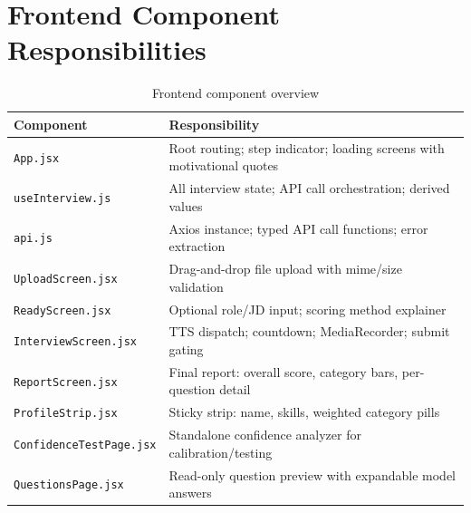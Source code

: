 \documentclass[12pt,a4paper]{article}
\begin{document}
\section{Frontend Component Responsibilities}

\begin{table}[H]
\centering
\caption{Frontend component overview}
\small
\begin{tabularx}{\textwidth}{l X}
\toprule
\textbf{Component} & \textbf{Responsibility} \\
\midrule
\texttt{App.jsx} & Root routing; step indicator; loading screens with motivational quotes \\
\texttt{useInterview.js} & All interview state; API call orchestration; derived values \\
\texttt{api.js} & Axios instance; typed API call functions; error extraction \\
\texttt{UploadScreen.jsx} & Drag-and-drop file upload with mime/size validation \\
\texttt{ReadyScreen.jsx} & Optional role/JD input; scoring method explainer \\
\texttt{InterviewScreen.jsx} & TTS dispatch; countdown; MediaRecorder; submit gating \\
\texttt{ReportScreen.jsx} & Final report: overall score, category bars, per-question detail \\
\texttt{ProfileStrip.jsx} & Sticky strip: name, skills, weighted category pills \\
\texttt{ConfidenceTestPage.jsx} & Standalone confidence analyzer for calibration/testing \\
\texttt{QuestionsPage.jsx} & Read-only question preview with expandable model answers \\
\bottomrule
\end{tabularx}
\end{table}
\end{document}
